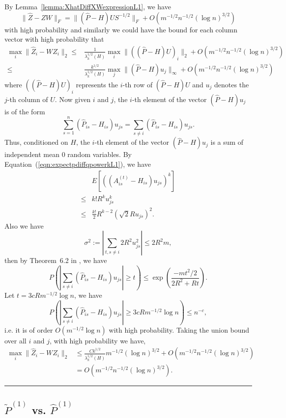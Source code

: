 \documentclass[a4paper]{article}
\newenvironment{proof}{{\bf Proof:  }}{\hfill\rule{2mm}{2mm}}
\renewcommand{\hat}{\widehat}
\begin{document}
\begin{proof}
By Lemma~\ref{lemma:XhatDiffXWexpressionL1}, we have
\[
	\|\hat{Z} - Z W\|_F = \| (\hat{P} - H) U S^{-1/2} \|_F + O(m^{-1/2} n^{-1/2} (\log n)^{3/2})
\]
 with high probability and similarly we could have the bound for each column vector with high probability that
\begin{align*}
	\max_i \| \hat{Z}_i - W Z_i \|_2
    \le & \frac{1}{\lambda_k^{1/2}(H)} \max_i \| ((\hat{P} - H) U)_i \|_2 + O(m^{-1/2} n^{-1/2} (\log n)^{3/2}) \\
    \le & \frac{k^{1/2}}{\lambda_k^{1/2}(H)} \max_j \| (\hat{P} - H) u_j \|_{\infty} + O(m^{-1/2} n^{-1/2} (\log n)^{3/2})
\end{align*}
where $((\hat{P} - H) U)_i$ represents the $i$-th row of $(\hat{P} - H) U$ and $u_j$ denotes the $j$-th column of $U$. Now given $i$ and $j$, the $i$-th element of the vector $(\hat{P} - H) u_j$ is of the form
\[
	\sum_{s=1}^n (\hat{P}_{is} - H_{is}) u_{js} = \sum_{s \ne i} (\hat{P}_{is} - H_{is}) u_{js}.
\]
Thus, conditioned on $H$, the $i$-th element of the vector $(\hat{P} - H) u_j$ is a sum of independent mean 0 random variables.
By Equation~(\ref{eqn:expectpdiffqpowerkL1}), we have
\begin{align*}
	& E\left[\left((A^{(t)}_{is} - H_{is}) u_{js}\right)^k\right] \\ 
    \le & k! R^k u_{js}^k \\
    \le & \frac{k!}{2} R^{k-2} (\sqrt{2} R u_{js})^2.
\end{align*}
Also we have
\[
	\sigma^2 := |\sum_{t, s \ne i} 2 R^2 u_{js}^2| \le 2 R^2 m,
\]
then by Theorem~6.2 in \citep{tropp2012user}, we have
\[
	P \left( \left| \sum_{s \ne i} (\hat{P}_{is} - H_{is}) u_{js} \right| \ge t \right)
    \le \exp \left( \frac{-m t^2/2}{2 R^2 + R t} \right).
\]
Let $t = 3 c R m^{-1/2} \log n$, we have
\[
	P \left( \left| \sum_{s \ne i} (\hat{P}_{is} - H_{is}) u_{js} \right| \ge 3 c R m^{-1/2} \log n \right)
    \le n^{-c},
\]
i.e. it is of order $O(m^{-1/2} \log n)$ with high probability.
Taking the union bound over all $i$ and $j$, with high probability we have,
\begin{align*}
	\max_i \| \hat{Z}_i - W Z_i \|_2
    & \le \frac{C k^{1/2}}{\lambda_k^{1/2}(H)} m^{-1/2} (\log n)^{3/2} + O(m^{-1/2} n^{-1/2} (\log n)^{3/2}) \\
    & = O(m^{-1/2} n^{-1/2} (\log n)^{3/2}).
\end{align*}
\end{proof}


\subsection{$\widetilde{P}^{(1)}$ vs. $\hat{P}^{(1)}$}
\label{section:pf_MLEvsMLEASE2}
\end{document}
